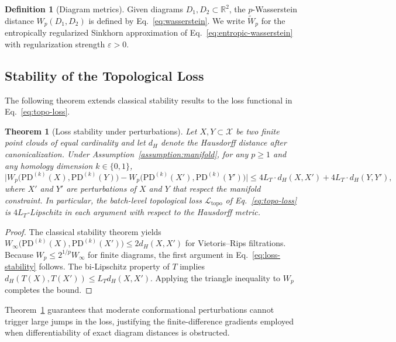 \documentclass[11pt]{article}
\newtheorem{theorem}{Theorem}
\theoremstyle{definition}
\newtheorem{definition}{Definition}
\begin{document}
\begin{definition}[Diagram metrics]
Given diagrams $D_1, D_2 \subset \mathbb{R}^2$, the $p$-Wasserstein distance $W_p(D_1, D_2)$ is defined by Eq.~\eqref{eq:wasserstein}. We write $\widetilde{W}_p$ for the entropically regularized Sinkhorn approximation of Eq.~\eqref{eq:entropic-wasserstein} with regularization strength $\varepsilon>0$.
\end{definition}

\subsection{Stability of the Topological Loss}
The following theorem extends classical stability results \cite{cohen2007stability, chazal2016structure} to the loss functional in Eq.~\eqref{eq:topo-loss}.

\begin{theorem}[Loss stability under perturbations]
\label{thm:loss-stability}
Let $X, Y \subset \mathcal{X}$ be two finite point clouds of equal cardinality and let $d_H$ denote the Hausdorff distance after canonicalization. Under Assumption~\ref{assumption:manifold}, for any $p \geq 1$ and any homology dimension $k \in \{0,1\}$,
\begin{equation}
    \big| W_p\big( \mathrm{PD}^{(k)}(X), \mathrm{PD}^{(k)}(Y) \big) - W_p\big( \mathrm{PD}^{(k)}(X'), \mathrm{PD}^{(k)}(Y') \big) \big| \leq 4 L_T \cdot d_H(X, X') + 4 L_T \cdot d_H(Y, Y'),
    \label{eq:loss-stability}
\end{equation}
where $X'$ and $Y'$ are perturbations of $X$ and $Y$ that respect the manifold constraint. In particular, the batch-level topological loss $\mathcal{L}_{\text{topo}}$ of Eq.~\eqref{eq:topo-loss} is $4L_T$-Lipschitz in each argument with respect to the Hausdorff metric.
\end{theorem}

\begin{proof}
The classical stability theorem \cite[Thm.~5.1]{cohen2007stability} yields $W_\infty\big( \mathrm{PD}^{(k)}(X), \mathrm{PD}^{(k)}(X') \big) \leq 2 d_H(X, X')$ for Vietoris--Rips filtrations. Because $W_p \leq 2^{1/p} W_\infty$ for finite diagrams, the first argument in Eq.~\eqref{eq:loss-stability} follows. The bi-Lipschitz property of $T$ implies $d_H(T(X), T(X')) \leq L_T d_H(X, X')$. Applying the triangle inequality to $W_p$ completes the bound.
\end{proof}

Theorem~\ref{thm:loss-stability} guarantees that moderate conformational perturbations cannot trigger large jumps in the loss, justifying the finite-difference gradients employed when differentiability of exact diagram distances is obstructed.
\end{document}
